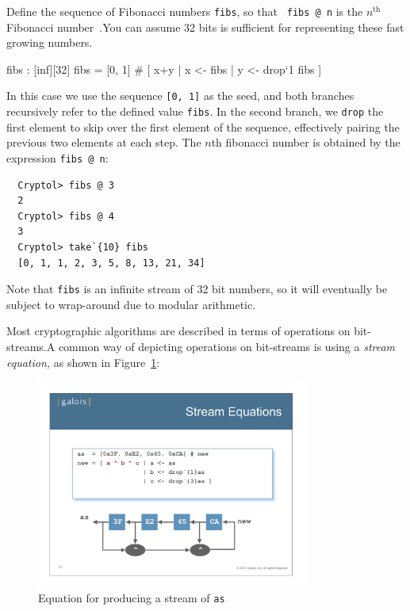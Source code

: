 \begin{Exercise}\label{ex:recfun:5}
  Define the sequence of Fibonacci numbers {\tt fibs}, so that {\tt
    fibs @ n} is the $n^{\mbox{th}}$ Fibonacci
  number~\cite{wiki:fibonacci}.\glosFibonacci You can assume 32 bits
  is sufficient for representing these fast growing
  numbers. 
\end{Exercise}
\begin{Answer}
\begin{code}
  fibs : [inf][32]
  fibs = [0, 1] # [ x+y | x <- fibs
                        | y <- drop`{1} fibs
                  ]
\end{code}
In this case we use the sequence {\tt [0, 1]} as the seed, and both
branches recursively refer to the defined value {\tt fibs}. In the
second branch, we {\tt drop} the first element to skip over the first
element of the sequence, effectively pairing the previous two elements
at each step.  The $n$th fibonacci number is obtained by the
expression {\tt fibs @ n}:\indDrop
\begin{Verbatim}
  Cryptol> fibs @ 3
  2
  Cryptol> fibs @ 4
  3
  Cryptol> take`{10} fibs
  [0, 1, 1, 2, 3, 5, 8, 13, 21, 34]
\end{Verbatim}
Note that {\tt fibs} is an infinite stream of 32 bit numbers, so it
will eventually be subject to wrap-around due to modular
arithmetic.\indModular
\end{Answer}


Most cryptographic algorithms are described in terms of operations on
bit-streams.\indStreamEquation A common way of depicting operations on
bit-streams is using a {\it stream equation,} as shown in
Figure~\ref{fig:streamDiagram}:
\begin{figure}[htbp]
\centering
\includegraphics[width=3.5in]{crashCourse/streamDiagram.pdf}
\caption{Equation for producing a stream of {\tt as}}
\label{fig:streamDiagram}
\end{figure}

